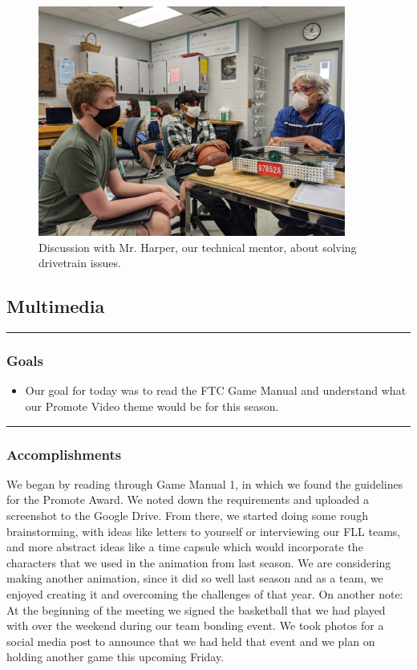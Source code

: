 \begin{figure}[htp]
\centering
\includegraphics[width=0.9\textwidth, angle=0]{Meetings/September/09-21-21/09-21-21 1.jpg}
\caption{Discussion with Mr. Harper, our technical mentor, about solving drivetrain issues.}
\label{fig:pic1}
\end{figure}

\subsection*{Multimedia}
\noindent\hfil\rule{\textwidth}{.4pt}\hfil
\subsubsection*{Goals}
\begin{itemize}
    \item Our goal for today was to read the FTC Game Manual and understand what our Promote Video theme would be for this season.  

\end{itemize} 

\noindent\hfil\rule{\textwidth}{.4pt}\hfil

\subsubsection*{Accomplishments}
We began by reading through Game Manual 1, in which we found the guidelines for the Promote Award. We noted down the requirements and uploaded a screenshot to the Google Drive. From there, we started doing some rough brainstorming, with ideas like letters to yourself or interviewing our FLL teams, and more abstract ideas like a time capsule which would incorporate the characters that we used in the animation from last season. We are considering making another animation, since it did so well last season and as a team, we enjoyed creating it and overcoming the challenges of that year. 
On another note: At the beginning of the meeting we signed the basketball that we had played with over the weekend during our team bonding event. We took photos for a social media post to announce that we had held that event and we plan on holding another game this upcoming Friday.

